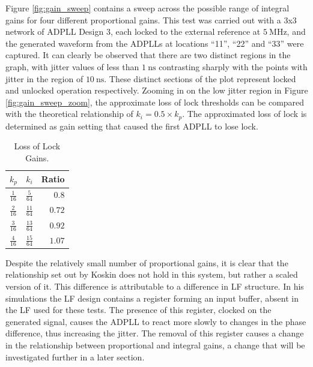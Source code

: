 Figure \ref{fig:gain_sweep} contains a sweep across the possible range of integral gains for four different proportional gains. This test was carried out with a 3x3 network of \ac{ADPLL} Design 3, each locked to the external reference at $5~\si{\mega\hertz}$, and the generated waveform from the \acp{ADPLL} at locations ``11'', ``22'' and  ``33'' were captured. It can clearly be observed that there are two distinct regions in the graph, with jitter values of less than $1~\si{\nano\second}$ contrasting sharply with the points with jitter in the region of $10~\si{\nano\second}$. These distinct sections of the plot represent locked and unlocked operation respectively. Zooming in on the low jitter region in Figure \ref{fig:gain_sweep_zoom}, the approximate loss of lock thresholds can be compared with the theoretical relationship of $k_i = 0.5\times k_p$. The approximated loss of lock is determined as gain setting that caused the first \ac{ADPLL} to lose lock.
\begin{table}[!h]
    \begin{center}
        \begin{tabular}{lrr}
            \multicolumn{1}{c}{$k_p$} & \multicolumn{1}{c}{$k_i$} & \multicolumn{1}{c}{Ratio} \T\B\\
            \hline
            $\frac{1}{16}$            & $\frac{5}{64}$            & $0.8$ \T\B\\
            $\frac{2}{16}$            & $\frac{11}{64}$           & $0.72$ \T\B\\
            $\frac{3}{16}$            & $\frac{13}{64}$           & $0.92$ \T\B\\
            $\frac{4}{16}$            & $\frac{15}{64}$           & $1.07$ \T\B
        \end{tabular}
    \end{center}
    \vspace{-0.5cm}
    \caption[Loss of Lock Gains]{Loss of Lock Gains.}
    \label{table:lolgains}
\end{table}

Despite the relatively small number of proportional gains, it is clear that the relationship set out by Koskin does not hold in this system, but rather a scaled version of it.  This difference is attributable to a difference in \ac{LF} structure. In his simulations the \ac{LF} design contains a register forming an input buffer, absent in the \ac{LF} used for these tests. The presence of this register, clocked on the generated signal, causes the \ac{ADPLL} to react more slowly to changes in the phase difference, thus increasing the jitter. The removal of this register causes a change in the relationship between proportional and integral gains, a change that will be investigated further in a later section.

